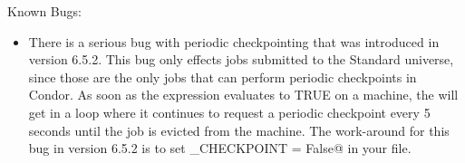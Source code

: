 \noindent Known Bugs:
\begin{itemize}

\item There is a serious bug with periodic checkpointing that was
  introduced in version 6.5.2.
  This bug only effects jobs submitted to the Standard universe, since
  those are the only jobs that can perform periodic checkpoints in
  Condor. 
  As soon as the  expression evaluates to
  TRUE on a machine, the  will get in a loop where it
  continues to request a periodic checkpoint every 5 seconds until the
  job is evicted from the machine.
  The work-around for this bug in version 6.5.2 is to set
  \verb@PERIODIC_CHECKPOINT = False@ in your 
  file.

\end{itemize}

